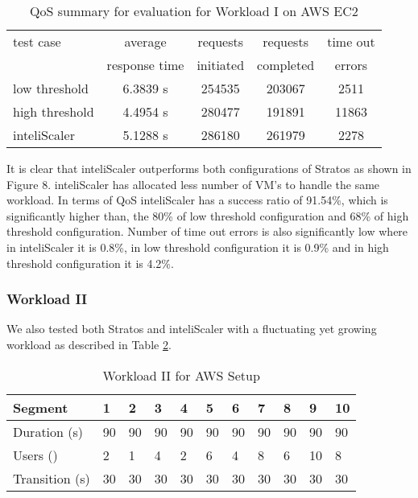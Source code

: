 \begin{table}[h!]
\centering
\caption{QoS summary for evaluation for Workload I on AWS EC2}
\label{table:analysis_qos_workload_3}
\begin{tabular}{|l|c|c|c|c|}
\hline

test case & average   & requests  & requests   & time out  \\
& response time & initiated & completed & errors\\ \hline

low threshold & 6.3839 s & 254535 & 203067 & 2511\\ \hline

high threshold & 4.4954 s & 280477 & 191891  & 11863\\ \hline

inteliScaler & 5.1288 s & 286180 & 261979  & 2278\\ \hline

\end{tabular}
\end{table}

It is clear that inteliScaler outperforms both configurations of Stratos as shown in Figure 8. inteliScaler has allocated less number of VM's to handle the same workload. In terms of QoS inteliScaler has a success ratio of 91.54\%, which is significantly higher than, the 80\% of low threshold configuration and 68\% of high threshold configuration. Number of time out errors is also significantly low where in inteliScaler it is  0.8\%, in low threshold configuration it is 0.9\%  and in high threshold configuration it is  4.2\%. 

\subsubsection{Workload II}
We also tested both Stratos and inteliScaler with a fluctuating yet growing workload as described in Table \ref{table:workload_5}.
\begin{table}[h!]
\centering
\caption{Workload II for AWS Setup}
\label{table:workload_5}
\begin{tabular}{|l|l|l|l|l|l|l|l|l|l|l|}
\hline
Segment & 1 & 2 & 3 & 4 & 5 & 6 & 7 & 8 & 9 & 10\\ \hline
Duration (s) & 90 & 90 & 90 & 90 & 90 & 90 & 90 & 90 & 90 & 90 \\ \hline
Users (\times100) & 2 & 1 & 4 & 2 & 6 & 4 & 8 & 6 & 10 & 8   \\ \hline
Transition (s) & 30 & 30 & 30 & 30 & 30 & 30 & 30 & 30 & 30 & 30  \\ \hline
\end{tabular}
\end{table}